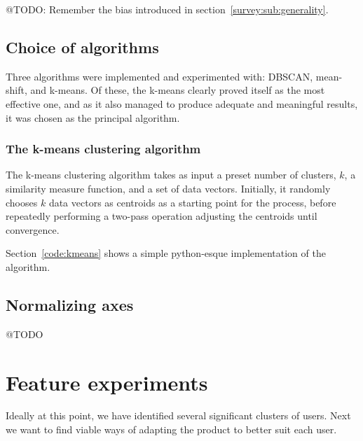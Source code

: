 @TODO: Remember the bias introduced in section~\ref{survey:sub:generality}.

\subsection{Choice of algorithms}
\label{approach:sec:clustering_algorithms}

Three algorithms were implemented and experimented with: DBSCAN, mean-shift, and k-means. Of these, the k-means clearly proved itself as the most effective one, and as it also managed to produce adequate and meaningful results, it was chosen as the principal algorithm.

\subsubsection{The k-means clustering algorithm}
\label{subs:kmeans}

The k-means clustering algorithm takes as input a preset number of clusters, $k$, a similarity measure function, and a set of data vectors. Initially, it randomly chooses $k$ data vectors as centroids as a starting point for the process, before repeatedly performing a two-pass operation adjusting the centroids until convergence.

Section~\ref{code:kmeans} shows a simple python-esque implementation of the algorithm.

%
%

\subsection{Normalizing axes}
\label{approach:sub:normalizing_axes}

@TODO

\section{Feature experiments}
\label{approach:sec:feature_experiments}

Ideally at this point, we have identified several significant clusters of users. Next we want to find viable ways of adapting the product to better suit each user.

